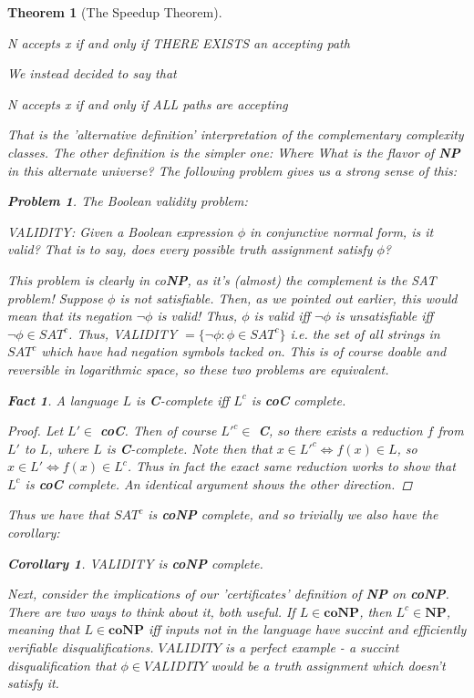 \documentclass{article}
\theoremstyle{definition}
\newtheorem{problem}{Problem}
\theoremstyle{plain}
\theoremstyle{theorem}
\newtheorem{fact}{Fact}[section]
\newtheorem{theorem}{Theorem}[section]
\newtheorem{corollary}{Corollary}[section]
\begin{document}
\begin{theorem}[The Speedup Theorem]
\begin{center}
    N accepts x if and only if THERE EXISTS an accepting path
\end{center}
We instead decided to say that
\begin{center}
    N accepts x if and only if ALL paths are accepting
\end{center}
That is the 'alternative definition' interpretation of the complementary complexity classes. The other definition is the simpler one: Where 
What is the flavor of \textbf{NP} in this alternate universe? The following problem gives us a strong sense of this:
\begin{problem} The Boolean validity problem:
\begin{center}
    VALIDITY: Given a Boolean expression $\phi$ in conjunctive normal form, is it valid? That is to say, does every possible truth assignment satisfy $\phi$?
\end{center}
\end{problem}
This problem is clearly in co\textbf{NP}, as it's (almost) the complement is the SAT problem! Suppose $\phi$ is not satisfiable. Then, as we pointed out earlier, this would mean that its negation $\neg \phi$ is valid! Thus, $\phi$ is valid iff $\neg \phi$ is unsatisfiable iff $\neg \phi \in SAT^c$. Thus, VALIDITY $=\{\neg \phi: \phi \in SAT^c\}$ i.e. the set of all strings in $SAT^c$ which have had negation symbols tacked on. This is of course doable and reversible in logarithmic space, so these two problems are equivalent.
\begin{fact}
    A language $L$ is \textbf{C}-complete iff $L^c$ is \textbf{coC} complete.
\end{fact}
\begin{proof}
    Let $L' \in$ \textbf{coC}. Then of course $L'^c \in$ \textbf{C}, so there exists a reduction $f$ from $L'$ to $L$, where $L$ is \textbf{C}-complete. Note then that $x \in L'^c \iff f(x) \in L$, so $x \in L' \iff f(x) \in L^c$. Thus in fact the exact same reduction works to show that $L^c$ is \textbf{coC} complete. An identical argument shows the other direction.
\end{proof}
Thus we have that $SAT^c$ is \textbf{coNP} complete, and so trivially we also have the corollary:
\begin{corollary}
    VALIDITY is \textbf{coNP} complete.
\end{corollary}
Next, consider the implications of our 'certificates' definition of \textbf{NP} on \textbf{coNP}. There are two ways to think about it, both useful. If $L \in \textbf{coNP}$, then $L^c \in \textbf{NP}$, meaning that $L \in \textbf{coNP}$ iff inputs not in the language have succint and efficiently verifiable \textit{disqualifications}. $VALIDITY$ is a perfect example - a succint disqualification that $\phi \in VALIDITY$ would be a truth assignment which doesn't satisfy it. 

\end{theorem}
\end{document}
